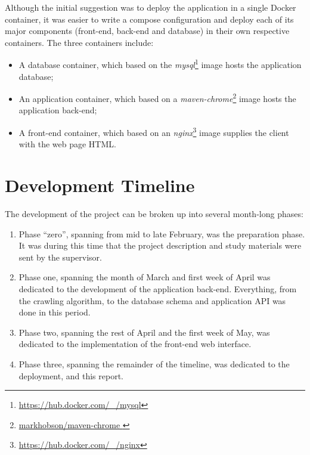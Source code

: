 Although the initial suggestion was to deploy the application in a single Docker container, it was easier to write a compose configuration and deploy each of its major components (front-end, back-end and database) in their own respective containers. The three containers include:
\begin{itemize}
    \item A database container, which based on the \textit{mysql}\footnote{\url{https://hub.docker.com/_/mysql}} image hosts the application database;
    \item An application container, which based on a \textit{maven-chrome}\footnote{\url{markhobson/maven-chrome
    }} image hosts the application back-end;
    \item A front-end container, which based on an \textit{nginx}\footnote{\url{https://hub.docker.com/_/nginx}} image supplies the client with the web page HTML\@.
\end{itemize}

\newpage
\section{Development Timeline}

The development of the project can be broken up into several month-long phases:
\begin{enumerate}
    \item Phase ``zero'', spanning from mid to late February, was the preparation phase. It was during this time that the project description and study materials were sent by the supervisor.
    \item Phase one, spanning the month of March and first week of April was dedicated to the development of the application back-end. Everything, from the crawling algorithm, to the database schema and application API was done in this period.
    \item Phase two, spanning the rest of April and the first week of May, was dedicated to the implementation of the front-end web interface.
    \item Phase three, spanning the remainder of the timeline, was dedicated to the deployment, and this report.
\end{enumerate}